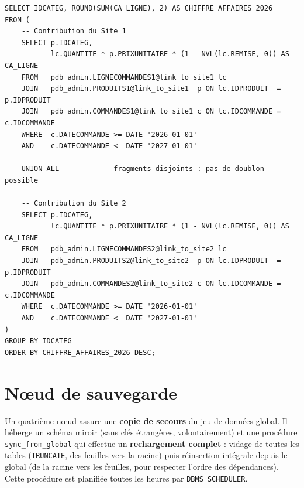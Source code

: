 \documentclass[11pt,a4paper]{article}
\begin{document}
\begin{lstlisting}[style=sql,caption={Chiffre d'affaires distribué reconstruit via les liens de base de données (extrait de \texttt{08\_distributed\_query.sql}).},label={lst:distrib}]
SELECT IDCATEG, ROUND(SUM(CA_LIGNE), 2) AS CHIFFRE_AFFAIRES_2026
FROM (
    -- Contribution du Site 1
    SELECT p.IDCATEG,
           lc.QUANTITE * p.PRIXUNITAIRE * (1 - NVL(lc.REMISE, 0)) AS CA_LIGNE
    FROM   pdb_admin.LIGNECOMMANDES1@link_to_site1 lc
    JOIN   pdb_admin.PRODUITS1@link_to_site1  p ON lc.IDPRODUIT  = p.IDPRODUIT
    JOIN   pdb_admin.COMMANDES1@link_to_site1 c ON lc.IDCOMMANDE = c.IDCOMMANDE
    WHERE  c.DATECOMMANDE >= DATE '2026-01-01'
    AND    c.DATECOMMANDE <  DATE '2027-01-01'

    UNION ALL          -- fragments disjoints : pas de doublon possible

    -- Contribution du Site 2
    SELECT p.IDCATEG,
           lc.QUANTITE * p.PRIXUNITAIRE * (1 - NVL(lc.REMISE, 0)) AS CA_LIGNE
    FROM   pdb_admin.LIGNECOMMANDES2@link_to_site2 lc
    JOIN   pdb_admin.PRODUITS2@link_to_site2  p ON lc.IDPRODUIT  = p.IDPRODUIT
    JOIN   pdb_admin.COMMANDES2@link_to_site2 c ON lc.IDCOMMANDE = c.IDCOMMANDE
    WHERE  c.DATECOMMANDE >= DATE '2026-01-01'
    AND    c.DATECOMMANDE <  DATE '2027-01-01'
)
GROUP BY IDCATEG
ORDER BY CHIFFRE_AFFAIRES_2026 DESC;
\end{lstlisting}

\section{Nœud de sauvegarde}

Un quatrième nœud assure une \textbf{copie de secours} du jeu de données global.
Il héberge un schéma miroir (sans clés étrangères, volontairement) et une
procédure \texttt{sync\_from\_global} qui effectue un \textbf{rechargement
complet} : vidage de toutes les tables (\texttt{TRUNCATE}, des feuilles vers la
racine) puis réinsertion intégrale depuis le global (de la racine vers les
feuilles, pour respecter l'ordre des dépendances). Cette procédure est
planifiée toutes les heures par \texttt{DBMS\_SCHEDULER}.
\end{document}
